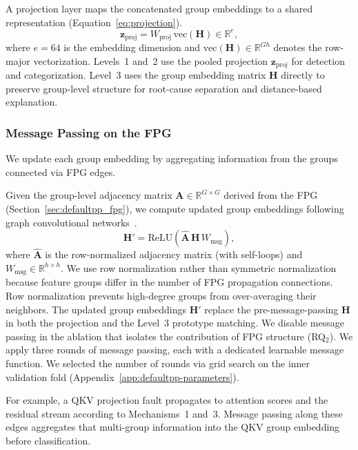 A projection layer maps the concatenated group embeddings to a shared representation (Equation~\ref{eq:projection}).
\begin{equation}
\mathbf{z}_{\text{proj}} = W_{\text{proj}} \, \text{vec}(\mathbf{H}) \in \mathbb{R}^{e},
\label{eq:projection}
\end{equation}
where $e = 64$ is the embedding dimension and $\text{vec}(\mathbf{H}) \in \mathbb{R}^{Gh}$ denotes the row-major vectorization. Levels~1 and~2 use the pooled projection $\mathbf{z}_{\text{proj}}$ for detection and categorization. Level~3 uses the group embedding matrix $\mathbf{H}$ directly to preserve group-level structure for root-cause separation and distance-based explanation.

\subsubsection{Message Passing on the FPG}
\label{sec:defaultpp_message_passing}

We update each group embedding by aggregating information from the groups connected via FPG edges.

Given the group-level adjacency matrix $\mathbf{A} \in \mathbb{R}^{G \times G}$ derived from the FPG (Section~\ref{sec:defaultpp_fpg}), we compute updated group embeddings following graph convolutional networks~\cite{kipf2017semi}.
\begin{equation}
\mathbf{H}' = \text{ReLU}\!\left(\hat{\mathbf{A}}\, \mathbf{H}\, W_{\text{msg}}\right),
\label{eq:message_passing}
\end{equation}
where $\hat{\mathbf{A}}$ is the row-normalized adjacency matrix (with self-loops) and $W_{\text{msg}} \in \mathbb{R}^{h \times h}$. We use row normalization rather than symmetric normalization because feature groups differ in the number of FPG propagation connections. Row normalization prevents high-degree groups from over-averaging their neighbors. The updated group embeddings $\mathbf{H}'$ replace the pre-message-passing $\mathbf{H}$ in both the projection and the Level~3 prototype matching. We disable message passing in the ablation that isolates the contribution of FPG structure (RQ$_2$). We apply three rounds of message passing, each with a dedicated learnable message function. We selected the number of rounds via grid search on the inner validation fold (Appendix~\ref{app:defaultpp-parameters}).

For example, a QKV projection fault propagates to attention scores and the residual stream according to Mechanisms~1 and~3. Message passing along these edges aggregates that multi-group information into the QKV group embedding before classification.

